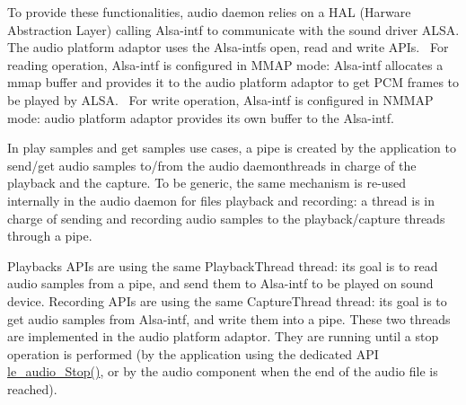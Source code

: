 To provide these functionalities, audio daemon relies on a H\+AL (Harware Abstraction Layer) calling Alsa-\/intf to communicate with the sound driver A\+L\+SA. The audio platform adaptor uses the Alsa-\/intf\textquotesingle{}s open, read and write A\+P\+Is.~\newline
 For reading operation, Alsa-\/intf is configured in M\+M\+AP mode\+: Alsa-\/intf allocates a mmap buffer and provides it to the audio platform adaptor to get P\+CM frames to be played by A\+L\+SA.~\newline
 For write operation, Alsa-\/intf is configured in N\+M\+M\+AP mode\+: audio platform adaptor provides its own buffer to the Alsa-\/intf.

In play samples and get samples use cases, a pipe is created by the application to send/get audio samples to/from the audio daemon\textquotesingle{}threads in charge of the playback and the capture. To be generic, the same mechanism is re-\/used internally in the audio daemon for files playback and recording\+: a thread is in charge of sending and recording audio samples to the playback/capture threads through a pipe.

Playbacks A\+P\+Is are using the same Playback\+Thread thread\+: its goal is to read audio samples from a pipe, and send them to Alsa-\/intf to be played on sound device. Recording A\+P\+Is are using the same Capture\+Thread thread\+: its goal is to get audio samples from Alsa-\/intf, and write them into a pipe. These two threads are implemented in the audio platform adaptor. They are running until a stop operation is performed (by the application using the dedicated A\+PI \hyperlink{le__audio__interface_8h_a4aebc6e8cdc4389c375e93418823af71}{le\+\_\+audio\+\_\+\+Stop()}, or by the audio component when the end of the audio file is reached).

